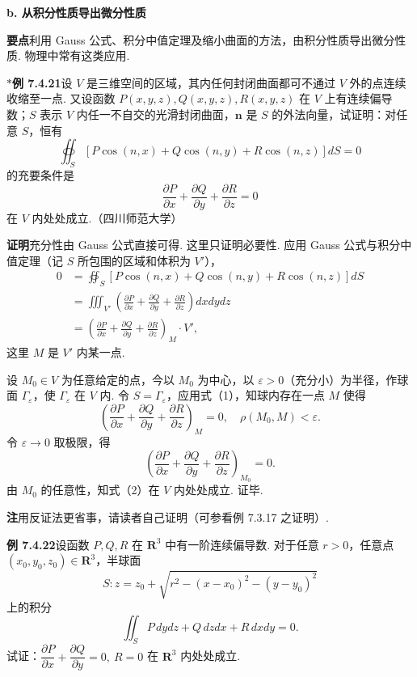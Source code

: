 \documentclass[UTF8, 12pt, fontset=fandol, oneside]{ctexart}
\begin{document}
\noindent\textbf{b. 从积分性质导出微分性质}

\noindent\textbf{要点}\quad 利用 Gauss 公式、积分中值定理及缩小曲面的方法，由积分性质导出微分性质. 物理中常有这类应用.

\noindent\textbf{$*$例 7.4.21}\quad 设 $V$ 是三维空间的区域，其内任何封闭曲面都可不通过 $V$ 外的点连续收缩至一点. 又设函数 $P(x,y,z),Q(x,y,z),R(x,y,z)$ 在 $V$ 上有连续偏导数；$S$ 表示 $V$ 内任一不自交的光滑封闭曲面，$\mathbf n$ 是 $S$ 的外法向量，试证明：对任意 $S$，恒有
\[
\oiint_S[P\cos(n,x)+Q\cos(n,y)+R\cos(n,z)]dS=0
\]
的充要条件是
\[
\frac{\partial P}{\partial x}+\frac{\partial Q}{\partial y}+\frac{\partial R}{\partial z}=0
\]
在 $V$ 内处处成立.（四川师范大学）

\noindent\textbf{证明}\quad 充分性由 Gauss 公式直接可得. 这里只证明必要性. 应用 Gauss 公式与积分中值定理（记 $S$ 所包围的区域和体积为 $V'$），
\begin{equation}
\begin{aligned}
0&=\oiint_S[P\cos(n,x)+Q\cos(n,y)+R\cos(n,z)]dS\\
&=\iiint_{V'}\left(\frac{\partial P}{\partial x}+\frac{\partial Q}{\partial y}+\frac{\partial R}{\partial z}\right)dxdydz\\
&=\left(\frac{\partial P}{\partial x}+\frac{\partial Q}{\partial y}+\frac{\partial R}{\partial z}\right)_M\cdot V',
\end{aligned}
\tag{1}
\end{equation}
这里 $M$ 是 $V'$ 内某一点.

设 $M_0\in V$ 为任意给定的点，今以 $M_0$ 为中心，以 $\varepsilon>0$（充分小）为半径，作球面 $\Gamma_\varepsilon$，使 $\Gamma_\varepsilon$ 在 $V$ 内. 令 $S=\Gamma_\varepsilon$，应用式（1），知球内存在一点 $M$ 使得
\[
\left(\frac{\partial P}{\partial x}+\frac{\partial Q}{\partial y}+\frac{\partial R}{\partial z}\right)_M=0,\quad \rho(M_0,M)<\varepsilon.
\]
令 $\varepsilon\to0$ 取极限，得
\begin{equation}
\left(\frac{\partial P}{\partial x}+\frac{\partial Q}{\partial y}+\frac{\partial R}{\partial z}\right)_{M_0}=0.
\tag{2}
\end{equation}
由 $M_0$ 的任意性，知式（2）在 $V$ 内处处成立. 证毕.

\noindent\textbf{注}\quad 用反证法更省事，请读者自己证明（可参看例 7.3.17 之证明）.

\noindent\textbf{例 7.4.22}\quad 设函数 $P,Q,R$ 在 $\mathbf R^3$ 中有一阶连续偏导数. 对于任意 $r>0$，任意点 $(x_0,y_0,z_0)\in\mathbf R^3$，半球面
\[
S:z=z_0+\sqrt{r^2-(x-x_0)^2-(y-y_0)^2}
\]
上的积分
\[
\iint_S P\,dydz+Q\,dzdx+R\,dxdy=0.
\]
试证：$\dfrac{\partial P}{\partial x}+\dfrac{\partial Q}{\partial y}=0,\ R=0$ 在 $\mathbf R^3$ 内处处成立.
\end{document}
